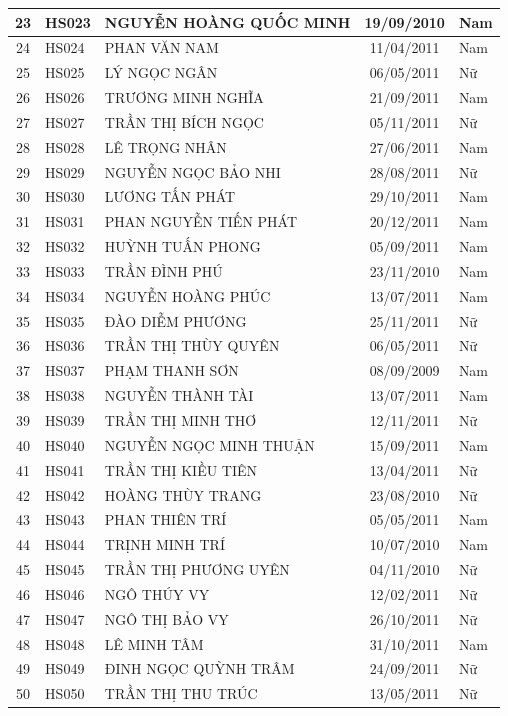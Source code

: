 \begin{longtable}{|c|l|p{6cm}|c|l|}
\hline
23 & HS023 & NGUYỄN HOÀNG QUỐC MINH & 19/09/2010 & Nam \\
\hline
24 & HS024 & PHAN VĂN NAM & 11/04/2011 & Nam \\
\hline
25 & HS025 & LÝ NGỌC NGÂN & 06/05/2011 & Nữ \\
\hline
26 & HS026 & TRƯƠNG MINH NGHĨA & 21/09/2011 & Nam \\
\hline
27 & HS027 & TRẦN THỊ BÍCH NGỌC & 05/11/2011 & Nữ \\
\hline
28 & HS028 & LÊ TRỌNG NHÂN & 27/06/2011 & Nam \\
\hline
29 & HS029 & NGUYỄN NGỌC BẢO NHI & 28/08/2011 & Nữ \\
\hline
30 & HS030 & LƯƠNG TẤN PHÁT & 29/10/2011 & Nam \\
\hline
31 & HS031 & PHAN NGUYỄN TIẾN PHÁT & 20/12/2011 & Nam \\
\hline
32 & HS032 & HUỲNH TUẤN PHONG & 05/09/2011 & Nam \\
\hline
33 & HS033 & TRẦN ĐÌNH PHÚ & 23/11/2010 & Nam \\
\hline
34 & HS034 & NGUYỄN HOÀNG PHÚC & 13/07/2011 & Nam \\
\hline
35 & HS035 & ĐÀO DIỄM PHƯƠNG & 25/11/2011 & Nữ \\
\hline
36 & HS036 & TRẦN THỊ THÙY QUYÊN & 06/05/2011 & Nữ \\
\hline
37 & HS037 & PHẠM THANH SƠN & 08/09/2009 & Nam \\
\hline
38 & HS038 & NGUYỄN THÀNH TÀI & 13/07/2011 & Nam \\
\hline
39 & HS039 & TRẦN THỊ MINH THƠ & 12/11/2011 & Nữ \\
\hline
40 & HS040 & NGUYỄN NGỌC MINH THUẬN & 15/09/2011 & Nam \\
\hline
41 & HS041 & TRẦN THỊ KIỀU TIÊN & 13/04/2011 & Nữ \\
\hline
42 & HS042 & HOÀNG THÙY TRANG & 23/08/2010 & Nữ \\
\hline
43 & HS043 & PHAN THIÊN TRÍ & 05/05/2011 & Nam \\
\hline
44 & HS044 & TRỊNH MINH TRÍ & 10/07/2010 & Nam \\
\hline
45 & HS045 & TRẦN THỊ PHƯƠNG UYÊN & 04/11/2010 & Nữ \\
\hline
46 & HS046 & NGÔ THÚY VY & 12/02/2011 & Nữ \\
\hline
47 & HS047 & NGÔ THỊ BẢO VY & 26/10/2011 & Nữ \\
\hline
48 & HS048 & LÊ MINH TÂM & 31/10/2011 & Nam \\
\hline
49 & HS049 & ĐINH NGỌC QUỲNH TRÂM & 24/09/2011 & Nữ \\
\hline
50 & HS050 & TRẦN THỊ THU TRÚC & 13/05/2011 & Nữ \\
\hline
\end{longtable}
